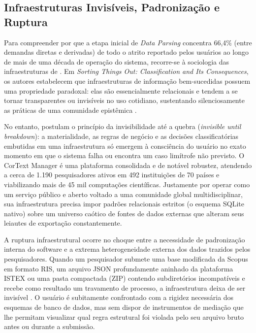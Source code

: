 \documentclass[
	oneside,
	a4paper,
	12pt,
	chapter=TITLE,
	section=TITLE,
	english,
	brazilian
]{abntex2}
\begin{document}
\FloatBarrier
\subsection{Infraestruturas Invisíveis, Padronização e Ruptura}\label{sec:infraestruturas_invisiveis_padronizacao_}


Para compreender por que a etapa inicial de \textit{Data Parsing} concentra 66,4\% (entre demandas diretas e derivadas) de todo o atrito reportado pelos usuários ao longo de mais de uma década de operação do sistema, recorre-se à sociologia das infraestruturas de . Em \textit{Sorting Things Out: Classification and Its Consequences}, os autores estabelecem que infraestruturas de informação bem-sucedidas possuem uma propriedade paradoxal: elas são essencialmente relacionais e tendem a se tornar transparentes ou invisíveis no uso cotidiano, sustentando silenciosamente as práticas de uma comunidade epistêmica \cite{Bowker1999}.

No entanto,  postulam o princípio da invisibilidade até a quebra (\textit{invisible until breakdown}): a materialidade, as regras de negócio e as decisões classificatórias embutidas em uma infraestrutura só emergem à consciência do usuário no exato momento em que o sistema falha ou encontra um caso limítrofe não previsto. O CorText Manager é uma plataforma consolidada e de notável robustez, atendendo a cerca de 1.190 pesquisadores ativos em 492 instituições de 70 países e viabilizando mais de 45 mil computações científicas. Justamente por operar como um serviço público e aberto voltado a uma comunidade global multidisciplinar, sua infraestrutura precisa impor padrões relacionais estritos (o esquema SQLite nativo) sobre um universo caótico de fontes de dados externas que alteram seus leiautes de exportação constantemente.

A ruptura infraestrutural ocorre no choque entre a necessidade de padronização interna do software e a extrema heterogeneidade externa dos dados trazidos pelos pesquisadores. Quando um pesquisador submete uma base modificada da Scopus em formato RIS, um arquivo JSON profundamente aninhado da plataforma ISTEX ou uma pasta compactada (ZIP) contendo subdiretórios incompatíveis e recebe como resultado um travamento de processo, a infraestrutura deixa de ser invisível \cite{CorText2026}. O usuário é subitamente confrontado com a rigidez necessária dos esquemas de banco de dados, mas sem dispor de instrumentos de mediação que lhe permitam visualizar qual regra estrutural foi violada pelo seu arquivo bruto antes ou durante a submissão.
\end{document}

